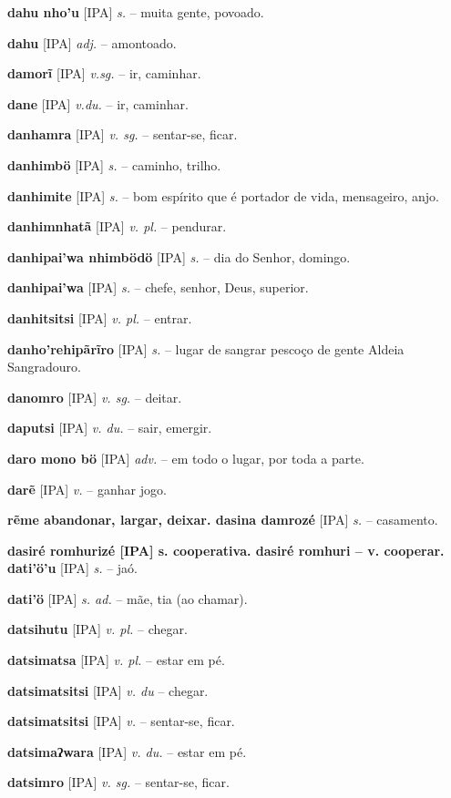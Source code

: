 \textbf{dahu nho'u} [IPA] \textit{s.} -- muita gente, povoado.

\textbf{dahu} [IPA] \textit{adj.} -- amontoado.

\textbf{damorĩ} [IPA] \textit{v.sg.} -- ir, caminhar.

\textbf{dane} [IPA] \textit{v.du.} -- ir, caminhar.

\textbf{danhamra} [IPA] \textit{v. sg.} -- sentar-se, ficar.

\textbf{danhimbö} [IPA] \textit{s.} -- caminho, trilho.

\textbf{danhimite} [IPA] \textit{s.} -- bom espírito que é portador de vida, mensageiro, anjo.

\textbf{danhimnhatã} [IPA] \textit{v. pl.} -- pendurar.

\textbf{danhipai'wa nhimbödö} [IPA] \textit{s.} -- dia do Senhor, domingo.

\textbf{danhipai'wa} [IPA] \textit{s.} -- chefe, senhor, Deus, superior.

\textbf{danhitsitsi} [IPA] \textit{v. pl.} -- entrar.

\textbf{danho'rehipãrĩro} [IPA] \textit{s.} -- lugar de sangrar pescoço de gente  Aldeia Sangradouro.

\textbf{danomro} [IPA] \textit{v. sg.} -- deitar.

\textbf{daputsi} [IPA] \textit{v. du.} -- sair, emergir.

\textbf{daro mono bö} [IPA] \textit{adv.} -- em todo o lugar, por toda a parte.

\textbf{darẽ} [IPA] \textit{v.} -- ganhar jogo.

\textbf{rẽme abandonar, largar, deixar. dasina damrozé} [IPA] \textit{s.} -- casamento.

\textbf{dasiré romhurizé [IPA] s. cooperativa. dasiré romhuri -- v. cooperar. dati'ö'u} [IPA] \textit{s.} -- jaó.

\textbf{dati'ö} [IPA] \textit{s. ad.} -- mãe, tia (ao chamar).

\textbf{datsihutu} [IPA] \textit{v. pl.} -- chegar.

\textbf{datsimatsa} [IPA] \textit{v. pl.} -- estar em pé.

\textbf{datsimatsitsi} [IPA] \textit{v. du} -- chegar.

\textbf{datsimatsitsi} [IPA] \textit{v.} -- sentar-se, ficar.

\textbf{datsimaʔwara} [IPA] \textit{v. du.} -- estar em pé.

\textbf{datsimro} [IPA] \textit{v. sg.} -- sentar-se, ficar.

